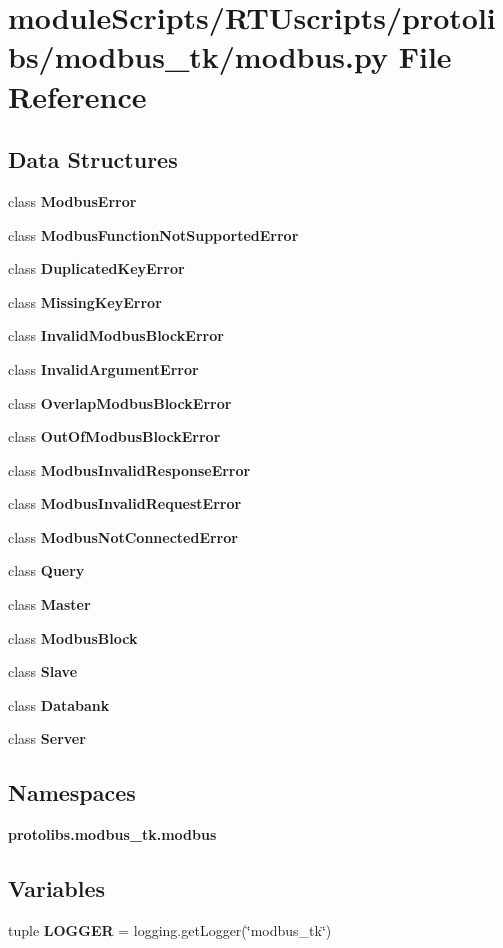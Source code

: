 \section{module\+Scripts/\+R\+T\+Uscripts/protolibs/modbus\+\_\+tk/modbus.py File Reference}
\label{modbus__tk_2modbus_8py}
\subsection*{Data Structures}
\begin{DoxyCompactItemize}
\item 
class {\bf Modbus\+Error}
\item 
class {\bf Modbus\+Function\+Not\+Supported\+Error}
\item 
class {\bf Duplicated\+Key\+Error}
\item 
class {\bf Missing\+Key\+Error}
\item 
class {\bf Invalid\+Modbus\+Block\+Error}
\item 
class {\bf Invalid\+Argument\+Error}
\item 
class {\bf Overlap\+Modbus\+Block\+Error}
\item 
class {\bf Out\+Of\+Modbus\+Block\+Error}
\item 
class {\bf Modbus\+Invalid\+Response\+Error}
\item 
class {\bf Modbus\+Invalid\+Request\+Error}
\item 
class {\bf Modbus\+Not\+Connected\+Error}
\item 
class {\bf Query}
\item 
class {\bf Master}
\item 
class {\bf Modbus\+Block}
\item 
class {\bf Slave}
\item 
class {\bf Databank}
\item 
class {\bf Server}
\end{DoxyCompactItemize}
\subsection*{Namespaces}
\begin{DoxyCompactItemize}
\item 
 {\bf protolibs.\+modbus\+\_\+tk.\+modbus}
\end{DoxyCompactItemize}
\subsection*{Variables}
\begin{DoxyCompactItemize}
\item 
tuple {\bf L\+O\+G\+G\+E\+R} = logging.\+get\+Logger(\char`\"{}modbus\+\_\+tk\char`\"{})
\end{DoxyCompactItemize}
